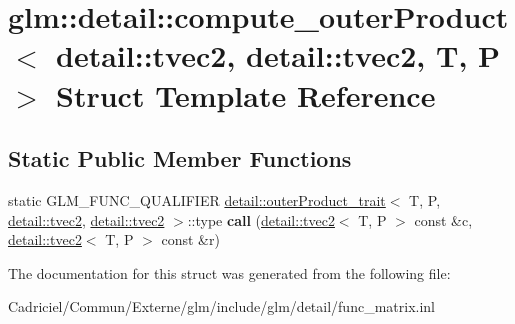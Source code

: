 \hypertarget{structglm_1_1detail_1_1compute__outer_product_3_01detail_1_1tvec2_00_01detail_1_1tvec2_00_01_t_00_01_p_01_4}{}\section{glm\+:\+:detail\+:\+:compute\+\_\+outer\+Product$<$ detail\+:\+:tvec2, detail\+:\+:tvec2, T, P $>$ Struct Template Reference}
\label{structglm_1_1detail_1_1compute__outer_product_3_01detail_1_1tvec2_00_01detail_1_1tvec2_00_01_t_00_01_p_01_4}
\subsection*{Static Public Member Functions}
\begin{DoxyCompactItemize}
\item 
static G\+L\+M\+\_\+\+F\+U\+N\+C\+\_\+\+Q\+U\+A\+L\+I\+F\+I\+ER \hyperlink{structglm_1_1detail_1_1outer_product__trait}{detail\+::outer\+Product\+\_\+trait}$<$ T, P, \hyperlink{structglm_1_1detail_1_1tvec2}{detail\+::tvec2}, \hyperlink{structglm_1_1detail_1_1tvec2}{detail\+::tvec2} $>$\+::type {\bfseries call} (\hyperlink{structglm_1_1detail_1_1tvec2}{detail\+::tvec2}$<$ T, P $>$ const \&c, \hyperlink{structglm_1_1detail_1_1tvec2}{detail\+::tvec2}$<$ T, P $>$ const \&r)\hypertarget{structglm_1_1detail_1_1compute__outer_product_3_01detail_1_1tvec2_00_01detail_1_1tvec2_00_01_t_00_01_p_01_4_ae252057faa56756fac328f1d86f0b281}{}\label{structglm_1_1detail_1_1compute__outer_product_3_01detail_1_1tvec2_00_01detail_1_1tvec2_00_01_t_00_01_p_01_4_ae252057faa56756fac328f1d86f0b281}

\end{DoxyCompactItemize}


The documentation for this struct was generated from the following file\+:\begin{DoxyCompactItemize}
\item 
Cadriciel/\+Commun/\+Externe/glm/include/glm/detail/func\+\_\+matrix.\+inl\end{DoxyCompactItemize}
